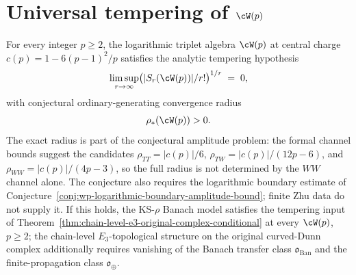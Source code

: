 \section{Universal tempering of $\cW(p)$}
\label{sec:universal-tempering-wp}

\begin{conjecture}
\label{conj:tempered-stratum-contains-wp}
For every integer $p \ge 2$, the logarithmic triplet algebra
$\cW(p)$ at central charge $c(p) = 1 - 6(p-1)^2 / p$ satisfies the
analytic tempering hypothesis
\[
 \limsup_{r \to \infty}
 \bigl( \lvert S_r(\cW(p)) \rvert / r! \bigr)^{1/r}
 \;=\; 0,
\]
with conjectural ordinary-generating convergence radius
\[
 \rho_*(\cW(p)) > 0.
\]
The exact radius is part of the conjectural amplitude problem: the
formal channel bounds suggest the candidates
$\rho_{TT}=\lvert c(p)\rvert/6$,
$\rho_{TW}=\lvert c(p)\rvert/(12p-6)$, and
$\rho_{WW}=\lvert c(p)\rvert/(4p-3)$, so the full radius is not
determined by the $WW$ channel alone. The conjecture also requires the
logarithmic boundary estimate of
Conjecture~\ref{conj:wp-logarithmic-boundary-amplitude-bound}; finite
Zhu data do not supply it.
If this holds, the KS-$\rho$ Banach model satisfies the tempering input
of Theorem~\ref{thm:chain-level-e3-original-complex-conditional} at
every $\cW(p)$, $p \ge 2$; the chain-level $E_3$-topological structure
on the original curved-Dunn complex additionally requires vanishing of
the Banach transfer class $\mathfrak{o}_{\mathrm{Ban}}$ and the
finite-propagation class $\mathfrak{o}_{\oplus}$.
\end{conjecture}

